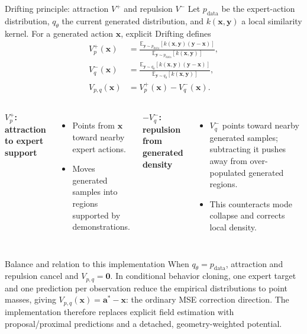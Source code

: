 \documentclass[aspectratio=169,10pt]{beamer}
\newcommand{\vect}[1]{\mathbf{#1}}
\begin{document}
\begin{frame}{Drifting principle: attraction $V^{+}$ and repulsion $V^{-}$}
  \small
  Let $p_{\mathrm{data}}$ be the expert-action distribution, $q_\theta$ the
  current generated distribution, and $k(\vect{x},\vect{y})$ a local similarity
  kernel. For a generated action $\vect{x}$, explicit Drifting defines
  \begin{align*}
    V_{p}^{+}(\vect{x})
      &=
      \frac{
        \mathbb{E}_{\vect{y}\sim p_{\mathrm{data}}}
        [k(\vect{x},\vect{y})(\vect{y}-\vect{x})]
      }{
        \mathbb{E}_{\vect{y}\sim p_{\mathrm{data}}}
        [k(\vect{x},\vect{y})]
      },\\
    V_{q}^{-}(\vect{x})
      &=
      \frac{
        \mathbb{E}_{\vect{y}\sim q_\theta}
        [k(\vect{x},\vect{y})(\vect{y}-\vect{x})]
      }{
        \mathbb{E}_{\vect{y}\sim q_\theta}
        [k(\vect{x},\vect{y})]
      },\\
    V_{p,q}(\vect{x})
      &=V_p^{+}(\vect{x})-V_q^{-}(\vect{x}).
  \end{align*}

  \begin{columns}[T]
      \textbf{$V_p^{+}$: attraction to expert support}
      \begin{itemize}
        \item Points from $\vect{x}$ toward nearby expert actions.
        \item Moves generated samples into regions supported by demonstrations.
      \end{itemize}
      \textbf{$-V_q^{-}$: repulsion from generated density}
      \begin{itemize}
        \item $V_q^{-}$ points toward nearby generated samples; subtracting it
              pushes away from over-populated generated regions.
        \item This counteracts mode collapse and corrects local density.
      \end{itemize}
  \end{columns}

  \begin{block}{Balance and relation to this implementation}
    When $q_\theta=p_{\mathrm{data}}$, attraction and repulsion cancel and
    $V_{p,q}=\vect{0}$. In conditional behavior cloning, one expert target and
    one prediction per observation reduce the empirical distributions to point
    masses, giving $V_{p,q}(\vect{x})=\vect{a}^{*}-\vect{x}$: the ordinary MSE
    correction direction. The implementation therefore replaces explicit field
    estimation with proposal/proximal predictions and a detached,
    geometry-weighted potential.
  \end{block}
\end{frame}
\end{document}
